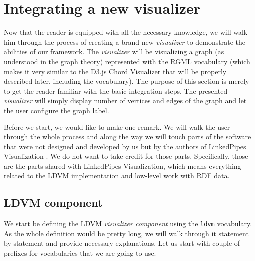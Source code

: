 
\section{Integrating a new visualizer}
\label{sec:implementation:integrating-visualizer}

Now that the reader is equipped with all the necessary knowledge, we will walk him through the process of creating a brand new \emph{visualizer} to demonstrate the abilities of our framework. The \emph{visualizer} will be visualizing a graph (as understood in the graph theory) represented with the RGML vocabulary (which makes it very similar to the D3.js Chord Visualizer that will be properly described later, including the vocabulary). The purpose of this section is merely to get the reader familiar with the basic integration steps. The presented \emph{visualizer} will simply display number of vertices and edges of the graph and let the user configure the graph label.

Before we start, we would like to make one remark. We will walk the user through the whole process and along the way we will touch parts of the software that were not designed and developed by us but by the authors of LinkedPipes Visualization \cite{linked_pipes_visualization}. We do not want to take credit for those parts. Specifically, those are the parts shared with LinkedPipes Visualization, which means everything related to the LDVM implementation and low-level work with RDF data.

\subsection{LDVM component}
\label{sec:implementation:integrating-visualizer:ldvm}

We start be defining the LDVM \emph{visualizer component} using the \texttt{ldvm} vocabulary. As the whole definition would be pretty long, we will walk through it statement by statement and provide necessary explanations. Let us start with couple of prefixes for vocabularies that we are going to use.

